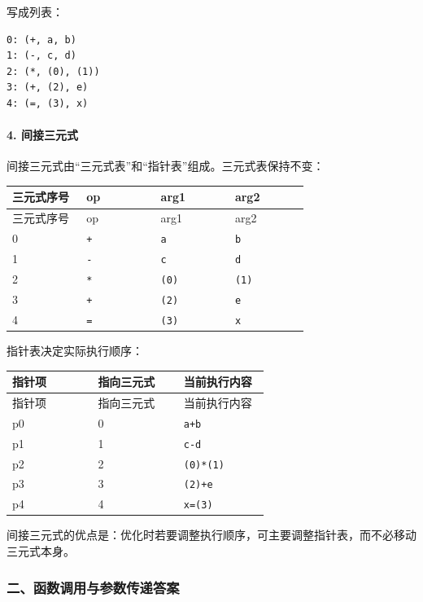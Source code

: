 \documentclass[UTF8]{ctexart}
\begin{document}
写成列表：

\begin{Verbatim}[fontsize=\small,breaklines=true]
0: (+, a, b)
1: (-, c, d)
2: (*, (0), (1))
3: (+, (2), e)
4: (=, (3), x)
\end{Verbatim}

\paragraph*{4. 间接三元式}

间接三元式由“三元式表”和“指针表”组成。三元式表保持不变：

\begin{longtable}{|p{0.23\linewidth}|p{0.23\linewidth}|p{0.23\linewidth}|p{0.23\linewidth}|}
\hline
三元式序号 & op & arg1 & arg2 \\
\hline
\endfirsthead
三元式序号 & op & arg1 & arg2 \\
\hline
\endhead
0 & \texttt{+} & \texttt{a} & \texttt{b} \\
\hline
1 & \texttt{-} & \texttt{c} & \texttt{d} \\
\hline
2 & \texttt{*} & \texttt{(0)} & \texttt{(1)} \\
\hline
3 & \texttt{+} & \texttt{(2)} & \texttt{e} \\
\hline
4 & \texttt{=} & \texttt{(3)} & \texttt{x} \\
\hline
\end{longtable}

指针表决定实际执行顺序：

\begin{longtable}{|p{0.31\linewidth}|p{0.31\linewidth}|p{0.31\linewidth}|}
\hline
指针项 & 指向三元式 & 当前执行内容 \\
\hline
\endfirsthead
指针项 & 指向三元式 & 当前执行内容 \\
\hline
\endhead
p0 & 0 & \texttt{a+b} \\
\hline
p1 & 1 & \texttt{c-d} \\
\hline
p2 & 2 & \texttt{(0)*(1)} \\
\hline
p3 & 3 & \texttt{(2)+e} \\
\hline
p4 & 4 & \texttt{x=(3)} \\
\hline
\end{longtable}

间接三元式的优点是：优化时若要调整执行顺序，可主要调整指针表，而不必移动三元式本身。

\subsubsection*{二、函数调用与参数传递答案}
\end{document}
